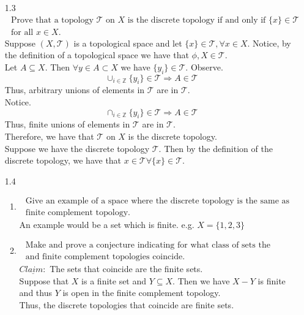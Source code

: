 \documentclass[12pt]{article}
\newcommand{\Z}{\mathds{Z}}
\newcommand{\T}{\mathcal{T}}
\begin{document}
\begin{enumerate}
	\item[1.3]$  \begin{array} { l } { \text { Prove that a topology } \mathcal { T } \text { on } X \text { is the discrete topology if and only if } \{ x \} \in \mathcal { T } } \\ { \text { for all } x \in X . } \end{array} $\\
	Suppose $ (X,\T) $ is a topological space and let $ \{x\}\in \T ,\forall x\in X$. Notice, by the definition of a topological space we have that $ \phi,X \in \T$. \\
	Let $ A\subseteq X $. Then $ \forall y\in A \subset X $ we have $ \{y_i\}\in \T $. Observe.
		\[\cup_{i\in\Z}\{y_i\}\in\T\Rightarrow A\in\T\]
	Thus, arbitrary unions of elements in $ \T $ are in $ \T $.\\
	Notice.
		\[\cap_{i\in\Z}\{y_i\}\in\T\Rightarrow A\in\T\]
	Thus, finite unions of elements in $\T $ are in $ \T $.\\
	Therefore, we have that $ \T $ on $ X $ is the discrete topology.
	\\
	Suppose we have the discrete topology $ \T $. Then by the definition of the discrete topology, we have that $ x\in\T \forall \{x\}\in \T $.
	\item[1.4] \begin{enumerate}
				\item $ \begin{array} { l } { \text { Give an example of a space where the discrete topology is the same as the } } \\ { \text { finite complement topology. } } \end{array} $
				An example would be a set which is finite. e.g. $ X=\{1,2,3\} $
				\item$  \begin{array} { l } { \text { Make and prove a conjecture indicating for what class of sets the discrete } } \\ { \text { and finite complement topologies coincide. } } \end{array}$\\
				$ \underline{Claim:} $ The sets that coincide are the finite sets.\\
				Suppose that $ X $ is a finite set and $ Y \subseteq X $. Then we have $ X-Y $ is finite and thus $ Y $ is open in the finite complement topology. \\
				Thus, the discrete topologies that coincide are finite sets.
			\end{enumerate}
	

\end{enumerate}
\end{document}
